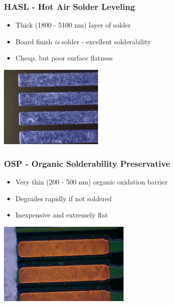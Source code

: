 \documentclass{beamer}
\begin{document}
\begin{frame}
\frametitle{HASL - Hot Air Solder Leveling}
\begin{itemize}
\item Thick (1800 - 5100 nm) layer of solder
\item Board finish \emph{is} solder - excellent solderability
\item Cheap, but poor surface flatness
\end{itemize}
\begin{center}
\includegraphics[height=4cm,keepaspectratio]{hasl.jpg}
\end{center}
\end{frame}

\begin{frame}
\frametitle{OSP - Organic Solderability Preservative}
\begin{itemize}
\item Very thin (200 - 500 nm) organic oxidation barrier
\item Degrades rapidly if not soldered
\item Inexpensive and extremely flat
\end{itemize}
\begin{center}
\includegraphics[height=4cm,keepaspectratio]{osp.jpg}
\end{center}
\end{frame}
\end{document}
